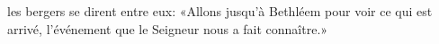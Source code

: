 \encetemps les bergers se dirent entre eux:
	«Allons jusqu’à Bethléem pour voir ce qui est arrivé,
	l’événement que le Seigneur nous a fait connaître.»
